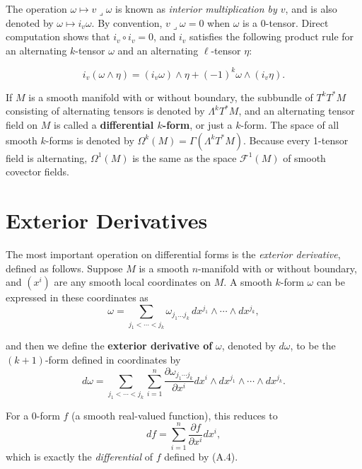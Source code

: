 The operation $\omega \mapsto v \lrcorner \omega$ is known as \emph{interior multiplication by $v$}, and is also denoted by $\omega \mapsto i_v\omega$. By convention, $v \lrcorner \omega = 0$ when $\omega$ is a 0-tensor. Direct computation shows that $i_v \circ i_v = 0$, and $i_v$ satisfies the following product rule for an alternating $k$-tensor $\omega$ and an alternating $\ell$-tensor $\eta$:

\begin{equation}
i_v(\omega \wedge \eta) = (i_v\omega) \wedge \eta + (-1)^k \omega \wedge (i_v\eta).
\tag{B.11}
\end{equation}

If $M$ is a smooth manifold with or without boundary, the subbundle of $T^k T^*M$ consisting of alternating tensors is denoted by $\Lambda^k T^* M$, and an alternating tensor field on $M$ is called a \textbf{differential $k$-form}, or just a $k$-form. The space of all smooth $k$-forms is denoted by $\Omega^k(M) = \Gamma(\Lambda^k T^* M)$. Because every 1-tensor field is alternating, $\Omega^1(M)$ is the same as the space $\mathcal{F}^1(M)$ of smooth covector fields.

\section{Exterior Derivatives}

The most important operation on differential forms is the \emph{exterior derivative}, defined as follows. Suppose $M$ is a smooth $n$-manifold with or without boundary, and $(x^i)$ are any smooth local coordinates on $M$. A smooth $k$-form $\omega$ can be expressed in these coordinates as
\[
\omega = \sum_{j_1 < \cdots < j_k} \omega_{j_1\ldots j_k} \, dx^{j_1} \wedge \cdots \wedge dx^{j_k},
\]

and then we define the \textbf{exterior derivative of} $\omega$, denoted by $d\omega$, to be the $(k+1)$-form defined in coordinates by
\[
d\omega = \sum_{j_1 < \cdots < j_k} \sum_{i=1}^n \frac{\partial \omega_{j_1 \cdots j_k}}{\partial x^i} dx^i \wedge dx^{j_1} \wedge \cdots \wedge dx^{j_k}.
\]

For a 0-form $f$ (a smooth real-valued function), this reduces to
\[
df = \sum_{i=1}^n \frac{\partial f}{\partial x^i} dx^i,
\]
which is exactly the \emph{differential} of $f$ defined by (A.4).

